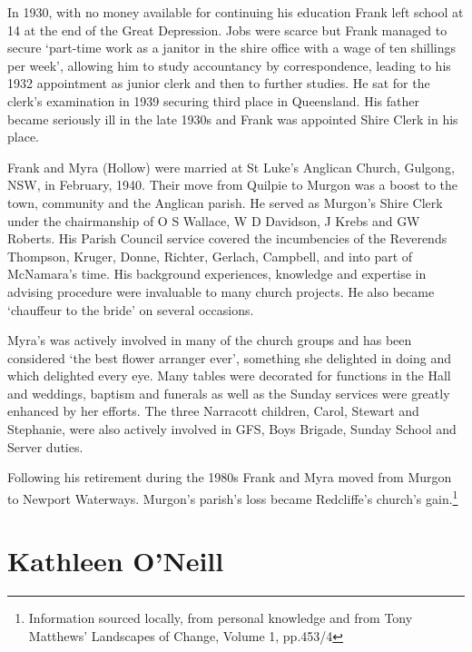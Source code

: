 In 1930, with no money available for continuing his education Frank left school at 14 at the end of the Great Depression. Jobs were scarce but Frank managed to secure `part-time work as a janitor in the shire office with a wage of ten shillings per week', allowing him to study accountancy by correspondence, leading to his 1932 appointment as junior clerk and then to further studies. He sat for the clerk's examination in 1939 securing third place in Queensland. His father became seriously ill in the late 1930s and Frank was appointed Shire Clerk in his place.

Frank and Myra (Hollow) were married at St Luke's Anglican Church, Gulgong, NSW, in February, 1940. Their move from Quilpie to Murgon was a boost to the town, community and the Anglican parish. He served as Murgon's Shire Clerk under the chairmanship of O S Wallace, W D Davidson, J Krebs and GW Roberts. His Parish Council service covered the incumbencies of the Reverends Thompson, Kruger, Donne, Richter, Gerlach, Campbell, and into part of McNamara's time. His background experiences, knowledge and expertise in advising procedure were invaluable to many church projects. He also became `chauffeur to the bride' on several occasions.

Myra's was actively involved in many of the church groups and has been considered `the best flower arranger ever', something she delighted in doing and which delighted every eye. Many tables were decorated for functions in the Hall and weddings, baptism and funerals as well as the Sunday services were greatly enhanced by her efforts. The three Narracott children, Carol, Stewart and Stephanie, were also actively involved in GFS, Boys Brigade, Sunday School and Server duties.

Following his retirement during the 1980s Frank and Myra moved from Murgon to Newport Waterways. Murgon's parish's loss became Redcliffe's church's gain.\footnote{Information sourced locally, from personal knowledge and from Tony Matthews' Landscapes of Change, Volume 1, pp.453/4}

\hypertarget{kathleen-oneill}{%
\section{Kathleen O'Neill}\label{kathleen-oneill}}

